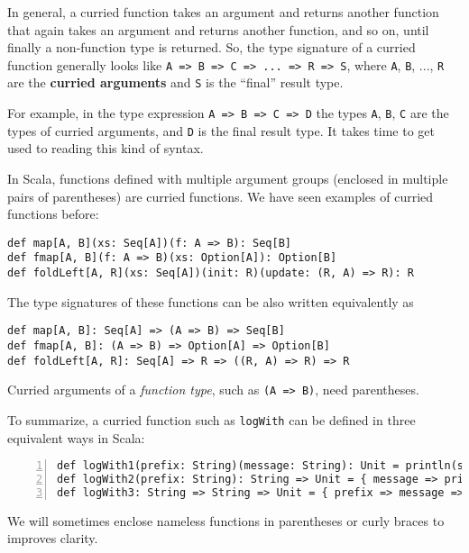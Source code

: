 In general, a curried function takes an argument and returns another
function that again takes an argument and returns another function,
and so on, until finally a non-function type is returned. So, the
type signature of a curried function generally looks like \lstinline!A => B => C => ... => R => S!,
where \lstinline!A!, \lstinline!B!, ..., \lstinline!R! are the
\textbf{curried arguments} and \lstinline!S!
is the \textsf{``}final\textsf{''} result type.

For example, in the type expression \lstinline!A => B => C => D!
the types \lstinline!A!, \lstinline!B!, \lstinline!C! are the types
of curried arguments, and \lstinline!D! is the final result type.
It takes time to get used to reading this kind of syntax.

In Scala, functions defined with multiple argument groups (enclosed
in multiple pairs of parentheses) are curried functions. We have seen
examples of curried functions before:
\begin{lstlisting}
def map[A, B](xs: Seq[A])(f: A => B): Seq[B]
def fmap[A, B](f: A => B)(xs: Option[A]): Option[B]
def foldLeft[A, R](xs: Seq[A])(init: R)(update: (R, A) => R): R
\end{lstlisting}
The type signatures of these functions can be also written equivalently
as
\begin{lstlisting}
def map[A, B]: Seq[A] => (A => B) => Seq[B]
def fmap[A, B]: (A => B) => Option[A] => Option[B]
def foldLeft[A, R]: Seq[A] => R => ((R, A) => R) => R
\end{lstlisting}
Curried arguments of a \emph{function type}, such as \lstinline!(A => B)!,
need parentheses.

To summarize, a curried function such as \lstinline!logWith! can
be defined in three equivalent ways in Scala:
\begin{lstlisting}[numbers=left]
def logWith1(prefix: String)(message: String): Unit = println(s"$prefix: $message")
def logWith2(prefix: String): String => Unit = { message => println(s"$prefix: $message") }
def logWith3: String => String => Unit = { prefix => message => println(s"$prefix: $message") }
\end{lstlisting}
We will sometimes enclose nameless functions in parentheses or curly
braces to improves clarity. 

